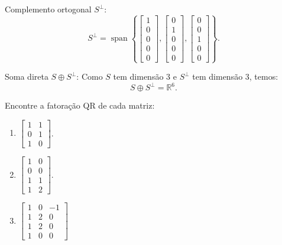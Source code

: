 \begin{resolution}
\begin{enumerate}[label=\alph*)]
          Complemento ortogonal \( S^\perp \):
          \[
            S^\perp = \operatorname{span}\left\{
            \begin{bmatrix}
              1 \\ 0 \\ 0 \\ 0 \\ 0
            \end{bmatrix},
            \begin{bmatrix}
              0 \\ 1 \\ 0 \\ 0 \\ 0
            \end{bmatrix},
            \begin{bmatrix}
              0 \\ 0 \\ 1 \\ 0 \\ 0
            \end{bmatrix}
            \right\}.
          \]

          Soma direta \( S \oplus S^\perp \):
          Como \( S \) tem dimensão 3 e \( S^\perp \) tem dimensão 3, temos:
          \[
            S \oplus S^\perp = \mathbb{R}^6.
          \]
  \end{enumerate}
\end{resolution}

\begin{question}
  Encontre a fatoração QR de cada matriz:
  \begin{multicols}{3}
    \begin{enumerate}[label=\alph*)]
      \item $\begin{bmatrix}
                1 & 1 \\ 0 & 1 \\ 1 & 0
              \end{bmatrix}$.
      \item $\begin{bmatrix}
                1 & 0 \\ 0 & 0 \\ 1 & 1 \\ 1 & 2
              \end{bmatrix}$.
      \item $\begin{bmatrix}
                1 & 0 & -1 \\ 1 & 2 & 0 \\ 1 & 2 & 0 \\ 1 & 0 & 0
              \end{bmatrix}$
    \end{enumerate}
  \end{multicols}
  \vspace{8pt}
\end{question}

